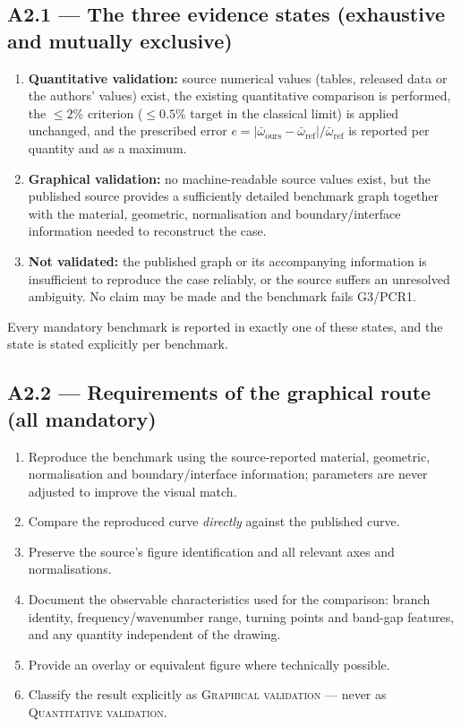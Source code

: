 \documentclass[11pt,a4paper]{article}
\begin{document}
\subsection*{A2.1 --- The three evidence states (exhaustive and mutually exclusive)}
\begin{enumerate}[label=\textbf{(\alph*)}]
\item \textbf{Quantitative validation:} source numerical values (tables, released data or the authors'
values) exist, the existing quantitative comparison is performed, the $\le 2\%$ criterion
($\le 0.5\%$ target in the classical limit) is applied unchanged, and the prescribed error
$e=|\bar\omega_{\mathrm{ours}}-\bar\omega_{\mathrm{ref}}|/\bar\omega_{\mathrm{ref}}$ is reported per
quantity and as a maximum.
\item \textbf{Graphical validation:} no machine-readable source values exist, but the published source
provides a sufficiently detailed benchmark graph together with the material, geometric, normalisation
and boundary/interface information needed to reconstruct the case.
\item \textbf{Not validated:} the published graph or its accompanying information is insufficient to
reproduce the case reliably, or the source suffers an unresolved ambiguity. No claim may be made and the
benchmark fails G3/PCR1.
\end{enumerate}
Every mandatory benchmark is reported in exactly one of these states, and the state is stated
explicitly per benchmark.

\subsection*{A2.2 --- Requirements of the graphical route (all mandatory)}
\begin{enumerate}[label=\textbf{G\arabic*.}]
\item Reproduce the benchmark using the source-reported material, geometric, normalisation and
boundary/interface information; parameters are never adjusted to improve the visual match.
\item Compare the reproduced curve \emph{directly} against the published curve.
\item Preserve the source's figure identification and all relevant axes and normalisations.
\item Document the observable characteristics used for the comparison: branch identity,
frequency/wavenumber range, turning points and band-gap features, and any quantity independent of the
drawing.
\item Provide an overlay or equivalent figure where technically possible.
\item Classify the result explicitly as \textsc{Graphical validation} --- never as
\textsc{Quantitative validation}.
\end{enumerate}
\end{document}
